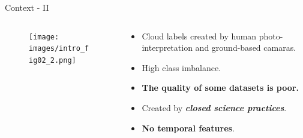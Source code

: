 \begin{frame}{Context - II}
	\begin{columns}
		\begin{column}{0.5\textwidth}
			\begin{figure}
				\texttt{[image: images/intro\_fig02\_2.png]}
				\label{fig:introfig02}
			\end{figure}	
		\end{column}
		\begin{column}{0.5\textwidth}
			\begin{itemize}
				\item Cloud labels created by human photo-interpretation and ground-based camaras.
				\item High class imbalance.	
				\item \textbf{The quality of some datasets is poor.}
				\item Created by \textbf{\textit{closed science practices}}.
				\item \textbf{No temporal features}.
			\end{itemize}
		\end{column}
	\end{columns}
\end{frame}

